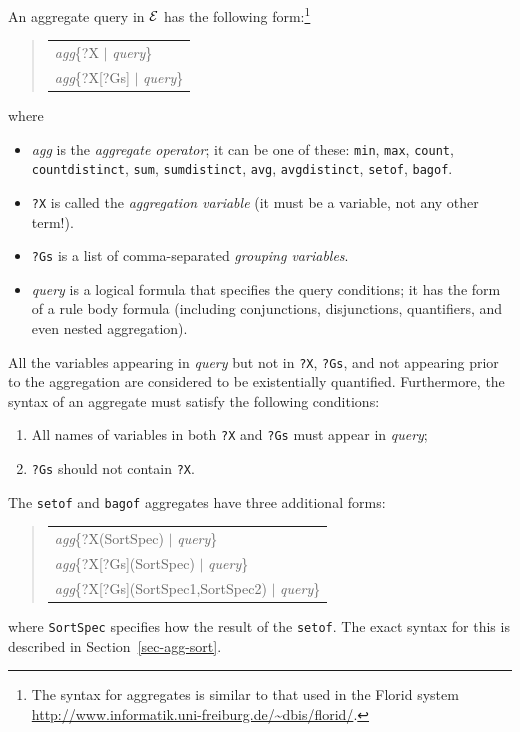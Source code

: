 \documentclass[11pt]{article}
\newcommand{\ERGO}{\mbox{\ensuremath{\cal{E}}\smaller{{\sc{RGO}}}}\xspace}
\newcommand{\FLSYSTEM}{\ERGO}
\newenvironment{qrules}{\begin{quote}\tt\begin{tabular}[t]{l}}%
{\end{tabular}\end{quote}}
\newcommand{\FLORID}{{\mbox{\sc Florid}}\xspace}
\begin{document}
An aggregate query in \FLSYSTEM has the following form:\footnote{
The syntax for aggregates is similar to that used in the \FLORID
system
  \url{http://www.informatik.uni-freiburg.de/~dbis/florid/}.
}
\begin{qrules}
\textnormal{\emph{agg}}\{?X $|$ {\it query}\}\\
\textnormal{\emph{agg}}\{?X[?Gs] $|$ {\it query}\}\\
\end{qrules}
%
where
\begin{itemize}
\item  \emph{agg} is the \emph{aggregate operator};  it can be one of these:
  \texttt{min},
  \texttt{max}, \texttt{count}, \texttt{countdistinct},  \texttt{sum},
  \texttt{sumdistinct},  \texttt{avg}, \texttt{avgdistinct},  \texttt{setof},
  \texttt{bagof}.
\item {\tt ?X} is called the \emph{aggregation variable} (it must be a
  variable, not any other term!).
\item {\tt ?Gs} is a list of comma-separated \emph{grouping variables}.
\item {\it query} is a logical formula that specifies the
  query conditions; it has the form of a rule body formula (including
  conjunctions, disjunctions, quantifiers, and even nested aggregation).
\end{itemize}

All the variables appearing in {\it query} but not in {\tt ?X}, {\tt ?Gs},
and not appearing prior to the aggregation are
considered to be existentially quantified. Furthermore, the syntax of an
aggregate must satisfy the following conditions:
\begin{enumerate}
\item All names of variables in both {\tt ?X} and {\tt ?Gs} must
appear in {\it query};
\item {\tt ?Gs} should not contain {\tt ?X}.
\end{enumerate}

\noindent
The \texttt{setof} and \texttt{bagof} aggregates have three additional
forms:  
\begin{qrules}
\textnormal{\emph{agg}}\{?X(SortSpec) $|$ {\it query}\}\\
\textnormal{\emph{agg}}\{?X[?Gs](SortSpec) $|$ {\it query}\}\\
\textnormal{\emph{agg}}\{?X[?Gs](SortSpec1,SortSpec2) $|$ {\it query}\}
\end{qrules}
where \texttt{SortSpec} specifies how the result of the \texttt{setof}. The
exact syntax for this is described in Section~\ref{sec-agg-sort}.
\end{document}
